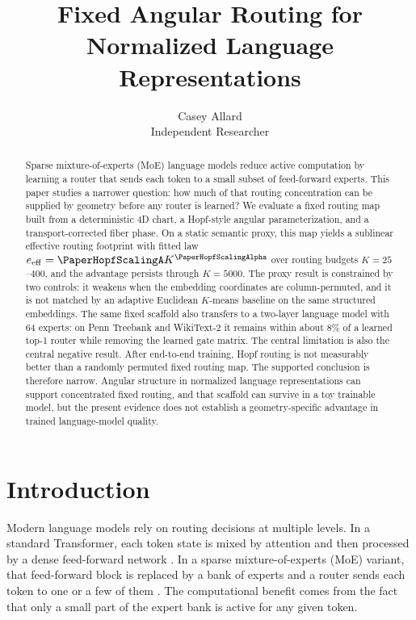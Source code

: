 \documentclass[10pt,letterpaper]{article}
\title{\textbf{Fixed Angular Routing for Normalized Language Representations}}
\author{Casey Allard\\Independent Researcher}
\date{}
\begin{document}
\maketitle

\begin{abstract}
Sparse mixture-of-experts (MoE) language models reduce active computation by learning a router that sends each token to a small subset of feed-forward experts. This paper studies a narrower question: how much of that routing concentration can be supplied by geometry before any router is learned? We evaluate a fixed routing map built from a deterministic 4D chart, a Hopf-style angular parameterization, and a transport-corrected fiber phase. On a static semantic proxy, this map yields a sublinear effective routing footprint with fitted law $e_{\mathrm{eff}}=\PaperHopfScalingA K^{\PaperHopfScalingAlpha}$ over routing budgets $K=25$--$400$, and the advantage persists through $K=5000$. The proxy result is constrained by two controls: it weakens when the embedding coordinates are column-permuted, and it is not matched by an adaptive Euclidean $K$-means baseline on the same structured embeddings. The same fixed scaffold also transfers to a two-layer language model with 64 experts: on Penn Treebank and WikiText-2 it remains within about $8\%$ of a learned top-1 router while removing the learned gate matrix. The central limitation is also the central negative result. After end-to-end training, Hopf routing is not measurably better than a randomly permuted fixed routing map. The supported conclusion is therefore narrow. Angular structure in normalized language representations can support concentrated fixed routing, and that scaffold can survive in a toy trainable model, but the present evidence does not establish a geometry-specific advantage in trained language-model quality.
\end{abstract}

\section{Introduction}
Modern language models rely on routing decisions at multiple levels. In a standard Transformer, each token state is mixed by attention and then processed by a dense feed-forward network \citep{vaswani2017attention}. In a sparse mixture-of-experts (MoE) variant, that feed-forward block is replaced by a bank of experts and a router sends each token to one or a few of them \citep{shazeer2017outrageously, lepikhin2021gshard, fedus2022switch, lewis2021base}. The computational benefit comes from the fact that only a small part of the expert bank is active for any given token.
\end{document}
